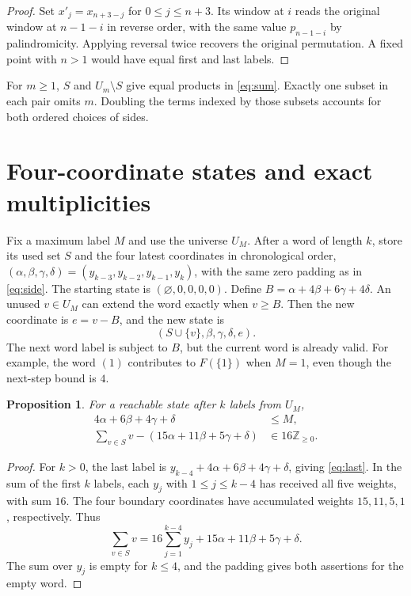\documentclass[11pt]{article}
\newtheorem{proposition}[theorem]{Proposition}
\newcommand{\NN}{\mathbb Z_{\geq 0}}
\begin{document}
\begin{proof}
Set \(x'_j=x_{n+3-j}\) for \(0\le j\le n+3\). Its window at \(i\)
reads the original window at \(n-1-i\) in reverse order, with the same
value \(p_{n-1-i}\) by palindromicity. Applying reversal twice recovers
the original permutation. A fixed point with \(n>1\) would have equal
first and last labels.
\end{proof}

For \(m\geq1\), \(S\) and \(U_m\setminus S\) give equal products in
\eqref{eq:sum}. Exactly one subset in each pair omits \(m\).
Doubling the terms indexed by those subsets accounts for both ordered
choices of sides.

\section{Four-coordinate states and exact multiplicities}

Fix a maximum label \(M\) and use the universe \(U_M\).
After a word of length \(k\), store its used set \(S\) and the four latest
coordinates in chronological order,
\((\alpha,\beta,\gamma,\delta)=(y_{k-3},y_{k-2},y_{k-1},y_k)\), with the same zero padding
as in \eqref{eq:side}. The starting state is
\((\varnothing,0,0,0,0)\). Define \(B=\alpha+4\beta+6\gamma+4\delta\).
An unused \(v\in U_M\) can extend the word exactly when \(v\ge B\).
Then the new coordinate is \(e=v-B\), and the new state is
\begin{equation}
 (S\cup\{v\},\beta,\gamma,\delta,e).
 \label{eq:transition}
\end{equation}
The next word label is subject to \(B\), but the current word is already
valid. For example, the word \((1)\) contributes to \(F(\{1\})\)
when \(M=1\), even though the next-step bound is \(4\).

\begin{proposition}\label{prop:bound}
For a reachable state after \(k\) labels from \(U_M\),
\begin{align}
 4\alpha+6\beta+4\gamma+\delta &\le M, \label{eq:last}\\
 \sum_{v\in S}v-(15\alpha+11\beta+5\gamma+\delta)
 &\in 16\NN. \label{eq:mass}
\end{align}
\end{proposition}

\begin{proof}
For \(k>0\), the last label is
\(y_{k-4}+4\alpha+6\beta+4\gamma+\delta\), giving \eqref{eq:last}. In the sum
of the first \(k\) labels, each \(y_j\) with \(1\le j\le k-4\) has
received all five weights, with sum \(16\). The four boundary coordinates
have accumulated weights \(15,11,5,1\), respectively. Thus
\[
 \sum_{v\in S}v=16\sum_{j=1}^{k-4}y_j+15\alpha+11\beta+5\gamma+\delta.
\]
The sum over \(y_j\) is empty for \(k\le4\), and the padding gives both assertions
for the empty word.
\end{proof}
\end{document}
